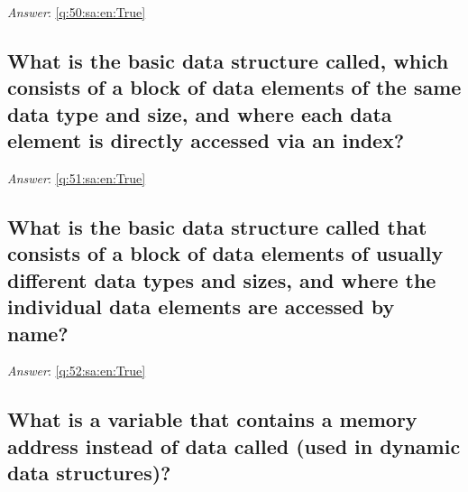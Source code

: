 \documentclass[a4paper,11pt,oneside]{article}
\begin{document}
\begin{sloppypar}
\label{q:50:sa:en:False}

\vspace{2cm}

\noindent\makebox[\textwidth]{\hrulefill}

\vspace{1cm}

\textit{Answer}: \autoref{q:50:sa:en:True}



\subsection{What is the basic data structure called, which consists of a block of data elements of the same data type and size, and where each data element is directly accessed via an index?}

\label{q:51:sa:en:False}

\vspace{2cm}

\noindent\makebox[\textwidth]{\hrulefill}

\vspace{1cm}

\textit{Answer}: \autoref{q:51:sa:en:True}



\subsection{What is the basic data structure called that consists of a block of data elements of usually different data types and sizes, and where the individual data elements are accessed by name?}

\label{q:52:sa:en:False}

\vspace{2cm}

\noindent\makebox[\textwidth]{\hrulefill}

\vspace{1cm}

\textit{Answer}: \autoref{q:52:sa:en:True}



\subsection{What is a variable that contains a memory address instead of data called (used in dynamic data structures)?}

\label{q:53:sa:en:False}

\vspace{2cm}


\end{sloppypar}
\end{document}
